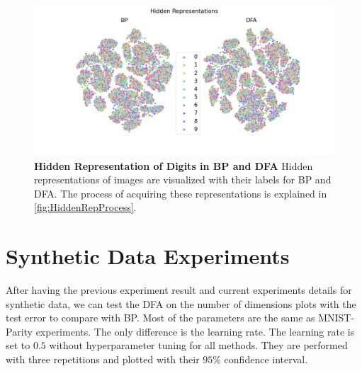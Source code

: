 \documentclass[a4paper, nobind]{templates/ociamthesis}
\begin{document}
\begin{figure}

{\centering \includegraphics[width=1\linewidth]{figures/3_tsne_BPDFA} 

}

\caption[Hidden Representation of Digits in BP and DFA]{\textbf{Hidden Representation of Digits in BP and DFA} \newline Hidden representations of images are visualized with their labels for BP and DFA. The process of acquiring these representations is explained in \ref{fig:HiddenRepProcess}.}\label{fig:tSNEBPDFA}
\end{figure}

\hypertarget{synthetic-data-experiments}{%
\section{Synthetic Data Experiments}\label{synthetic-data-experiments}}

After having the previous experiment result and current experiments details for synthetic data, we can test the DFA on the number of dimensions plots with the test error to compare with BP. Most of the parameters are the same as MNIST-Parity experiments. The only difference is the learning rate. The learning rate is set to \(0.5\) without hyperparameter tuning for all methods. They are performed with three repetitions and plotted with their \(95\%\) confidence interval.
\end{document}
